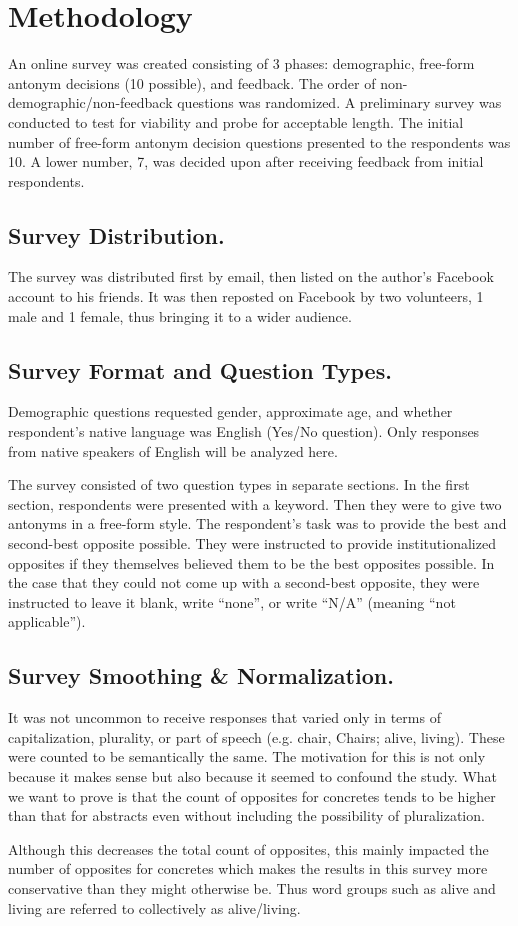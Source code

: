 \section {Methodology}
An online survey was created consisting of 3 phases: demographic, free-form antonym decisions (10 possible), and feedback.  The order of non-demographic/non-feedback questions was randomized.  A preliminary survey was conducted to test for viability and probe for acceptable length.  The initial number of free-form antonym decision questions presented to the respondents was 10.  A lower number, 7, was decided upon after receiving feedback from initial respondents.  

\subsection{Survey Distribution.} The survey was distributed first by email, then listed on the author’s Facebook account to his friends.  It was then reposted on Facebook by two volunteers, 1 male and 1 female, thus bringing it to a wider audience.  

\subsection{Survey Format and Question Types.} Demographic questions requested gender, approximate age, and whether respondent’s native language was English (Yes/No question).  Only responses from native speakers of English will be analyzed here. 

The survey consisted of two question types in separate sections. In the first section, respondents were presented with a keyword. Then they were to give two antonyms in a free-form style. The respondent’s task was to provide the best and second-best opposite possible.  They were instructed to provide institutionalized opposites if they themselves believed them to be the best opposites possible. In the case that they could not come up with a second-best opposite, they were instructed to leave it blank, write “none”, or write “N/A” (meaning “not applicable”).  

\subsection{Survey Smoothing \& Normalization.} It was not uncommon to receive responses that varied only in terms of capitalization, plurality, or part of speech (e.g. chair, Chairs; alive, living).  These were counted to be semantically the same.  The motivation for this is not only because it makes sense but also because it seemed to confound the study.  What we want to prove is that the count of opposites for concretes tends to be higher than that for abstracts even without including the possibility of pluralization. 

Although this decreases the total count of opposites, this mainly impacted the number of opposites for concretes which makes the results in this survey more conservative than they might otherwise be.  Thus word groups such as alive and living are referred to collectively as alive/living. 
